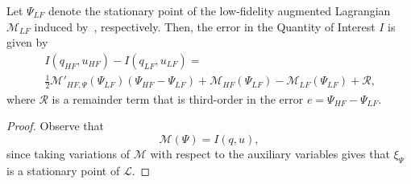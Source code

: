 \begin{proposition}
Let $\Psi_{LF}$ denote the stationary point of the low-fidelity augmented Lagrangian $\mathcal{M}_{LF}$ induced by~, respectively. Then, the error in the Quantity of Interest $I$ is given by
%
\begin{multline}
\label{eq:semifinErrExp}
I(q_{HF},u_{HF})-I(q_{LF},u_{LF})=\\\frac{1}{2}\mathcal{M}'_{HF,\Psi}(\Psi_{LF})(\Psi_{HF}-\Psi_{LF})+\mathcal{M}_{HF}(\Psi_{LF})-\mathcal{M}_{LF}(\Psi_{LF})+\mathcal{R}\textrm{,}
\end{multline}
%
where $\mathcal{R}$ is a remainder term that is third-order in the error $e=\Psi_{HF}-\Psi_{LF}$.
\end{proposition}
%
\begin{proof}
%
Observe that
%
\begin{equation}
\label{eq:MeqI}
\mathcal{M}(\Psi)=I(q,u),
\end{equation}
%
since taking variations of $\mathcal{M}$ with respect to the auxiliary variables gives that $\xi_\Psi$ is a stationary point of $\mathcal{L}$.


\end{proof}
